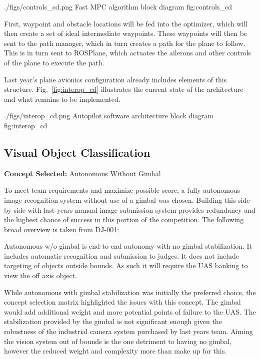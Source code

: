 \AUVSIFigure
{./figs/controls_cd.png}
{\textwidth}
{Fast MPC algorithm block diagram}
{fig:controls_cd}

First, waypoint and obstacle locations will be fed into the optimizer, which will then create a set of ideal intermediate waypoints. These waypoints will then be sent to the path manager, which in turn creates a path for the plane to follow. This is in turn sent to ROSPlane, which actuates the ailerons and other controls of the plane to execute the path.

Last year’s plane avionics configuration already includes elements of this structure. Fig.~\ref{fig:interop_cd} illustrates the current state of the architecture and what remains to be implemented.

\AUVSIFigure
{./figs/interop_cd.png}
{\textwidth}
{Autopilot software architecture block diagram}
{fig:interop_cd}

\subsection{Visual Object Classification}

\textbf{Concept Selected:} Autonomous Without Gimbal

To meet team requirements and maximize possible score, a fully autonomous image recognition system without use of a gimbal was chosen. Building this side-by-side with last years manual image submission system provides redundancy and the highest chance of success in this portion of the competition. The following broad overview is taken from DJ-001:

\begin{largequote}
Autonomous w/o gimbal is end-to-end autonomy with no gimbal stabilization. It includes automatic recognition and submission to judges. It does not include targeting of objects outside bounds. As such it will require the UAS banking to view the off axis object.
\end{largequote}

While autonomous with gimbal stabilization was initially the preferred choice, the concept selection matrix highlighted the issues with this concept. The gimbal would add additional weight and more potential points of failure to the UAS. The stabilization provided by the gimbal is not significant enough given the robustness of the industrial camera system purchased by last years team. Aiming the vision system out of bounds is the one detriment to having no gimbal, however the reduced weight and complexity more than make up for this.

